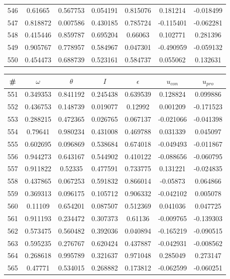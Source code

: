 \begin{table}
\begin{tabular}{c|c|c|c|c|c|c}
546 & 0.61665 & 0.567753 & 0.054191 & 0.815076 & 0.181214 & -0.018499\\
547 & 0.818872 & 0.007586 & 0.430185 & 0.785724 & -0.115401 & -0.062281\\
548 & 0.415446 & 0.859787 & 0.695204 & 0.66063 & 0.102771 & 0.281396\\
549 & 0.905767 & 0.778957 & 0.584967 & 0.047301 & -0.490959 & -0.059132\\
550 & 0.454473 & 0.688739 & 0.523161 & 0.584737 & 0.055062 & 0.132631\\
\end{tabular}
\end{table}
\newpage
\begin{table}
\begin{tabular}{c|c|c|c|c|c|c}
\# & $\omega$ & $\theta$ & $I$ & $\epsilon$ & $u_{con}$ & $u_{pro}$\\
\hline
551 & 0.349353 & 0.841192 & 0.245438 & 0.639539 & 0.128824 & 0.099886\\
552 & 0.436753 & 0.148739 & 0.019077 & 0.12992 & 0.001209 & -0.171523\\
553 & 0.288215 & 0.472365 & 0.026765 & 0.067137 & -0.021066 & -0.041398\\
554 & 0.79641 & 0.980234 & 0.431008 & 0.469788 & 0.031339 & 0.045097\\
555 & 0.602695 & 0.096869 & 0.538684 & 0.674018 & -0.049493 & -0.011867\\
556 & 0.944273 & 0.643167 & 0.544902 & 0.410122 & -0.088656 & -0.060795\\
557 & 0.911822 & 0.52335 & 0.477591 & 0.733775 & 0.131221 & -0.024835\\
558 & 0.437865 & 0.067253 & 0.591832 & 0.866014 & -0.05873 & 0.064866\\
559 & 0.369313 & 0.096175 & 0.105712 & 0.906332 & -0.042102 & 0.005078\\
560 & 0.11109 & 0.654201 & 0.087507 & 0.512369 & 0.041036 & 0.047725\\
561 & 0.911193 & 0.234472 & 0.307373 & 0.61136 & -0.009765 & -0.139303\\
562 & 0.573475 & 0.560482 & 0.392036 & 0.040894 & -0.165219 & -0.090515\\
563 & 0.595235 & 0.276767 & 0.620424 & 0.437887 & -0.042931 & -0.008562\\
564 & 0.268618 & 0.995789 & 0.321637 & 0.971048 & 0.285049 & 0.273147\\
565 & 0.47771 & 0.534015 & 0.268882 & 0.173812 & -0.062599 & -0.060251\\

\end{tabular}
\end{table}
